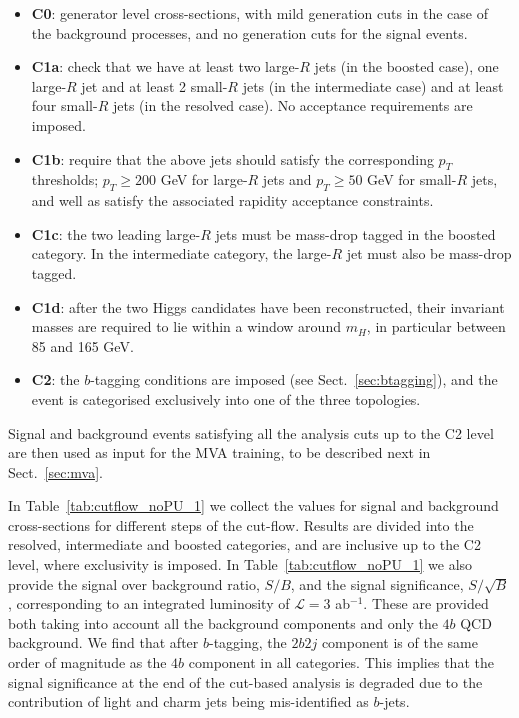     \begin{itemize}
    \item {\bf C0}:  generator level cross-sections, with
      mild generation cuts in the case of the background processes, and no
      generation cuts
      for the signal events.
    \item {\bf C1a}:  check that we have at least
      two large-$R$ jets (in the boosted case),
      one large-$R$ jet and at least 2 small-$R$ jets (in the intermediate
      case) and at least four small-$R$ jets (in the resolved case).
      No acceptance requirements are imposed.
    \item {\bf C1b}: require that the above jets should
      satisfy the corresponding $p_T$ thresholds;
      $p_T \ge 200$ GeV for large-$R$ jets and
      $p_T \ge 50$ GeV for small-$R$ jets, and well as
      satisfy the associated
      rapidity acceptance constraints.
    \item {\bf C1c}: the two leading large-$R$ jets must
      be mass-drop tagged in the boosted category.
      In the intermediate category, the large-$R$ jet must also be mass-drop tagged.
    \item {\bf C1d}: after the two Higgs candidates  have been reconstructed,
      their invariant masses are required to lie within a window around $m_H$,
      in particular between 85 and 165 GeV.
          \item {\bf C2}: the
            $b$-tagging conditions are
            imposed (see
            Sect.~\ref{sec:btagging}), and the event is categorised exclusively
            into one of the three topologies.
      \end{itemize}
    Signal and background events satisfying all the analysis cuts up to the
    C2 level
    are then used as input for the MVA training, to be described next
    in Sect.~\ref{sec:mva}.

    
    In Table~\ref{tab:cutflow_noPU_1} we collect
    the values for signal and background cross-sections
    for different steps of the cut-flow.
    Results are divided into the resolved, intermediate and boosted categories,
    and are inclusive up to the C2 level, where exclusivity is imposed.
In Table~\ref{tab:cutflow_noPU_1} we also  provide the signal over
      background ratio, $S/B$, and the signal
      significance, $S/\sqrt{B}$, corresponding to an integrated
      luminosity of $\mathcal{L}=3$ ab$^{-1}$.
      These are provided both taking into account all the background components and only
      the $4b$ QCD background.
      We find that after $b$-tagging, the  $2b2j$ component is
      of the same order of magnitude as the $4b$ component in all categories.
      This implies that the signal significance at the end of the cut-based
      analysis is degraded due to the contribution
      of light and charm jets being mis-identified as $b$-jets.
    

